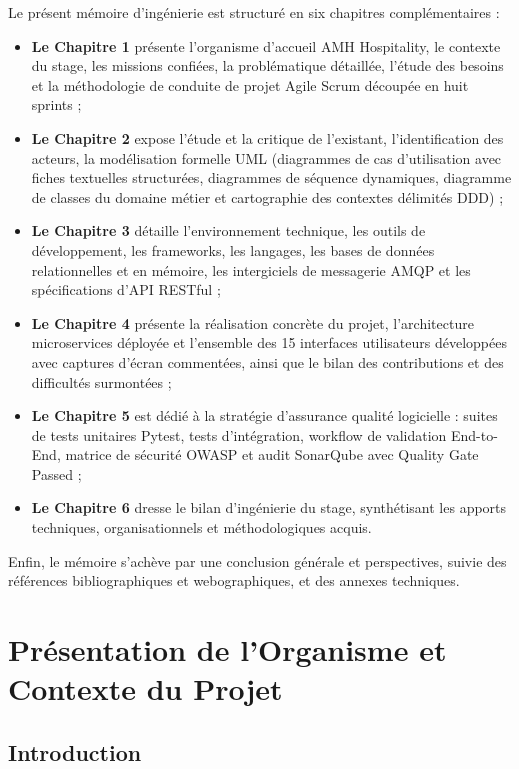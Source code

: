 \documentclass[12pt,a4paper,oneside]{report}
\begin{document}
Le présent mémoire d'ingénierie est structuré en six chapitres complémentaires :
\begin{itemize}
    \item \textbf{Le Chapitre 1} présente l'organisme d'accueil AMH Hospitality, le contexte du stage, les missions confiées, la problématique détaillée, l'étude des besoins et la méthodologie de conduite de projet Agile Scrum découpée en huit sprints ;
    \item \textbf{Le Chapitre 2} expose l'étude et la critique de l'existant, l'identification des acteurs, la modélisation formelle UML (diagrammes de cas d'utilisation avec fiches textuelles structurées, diagrammes de séquence dynamiques, diagramme de classes du domaine métier et cartographie des contextes délimités DDD) ;
    \item \textbf{Le Chapitre 3} détaille l'environnement technique, les outils de développement, les frameworks, les langages, les bases de données relationnelles et en mémoire, les intergiciels de messagerie AMQP et les spécifications d'API RESTful ;
    \item \textbf{Le Chapitre 4} présente la réalisation concrète du projet, l'architecture microservices déployée et l'ensemble des 15 interfaces utilisateurs développées avec captures d'écran commentées, ainsi que le bilan des contributions et des difficultés surmontées ;
    \item \textbf{Le Chapitre 5} est dédié à la stratégie d'assurance qualité logicielle : suites de tests unitaires Pytest, tests d'intégration, workflow de validation End-to-End, matrice de sécurité OWASP et audit SonarQube avec Quality Gate Passed ;
    \item \textbf{Le Chapitre 6} dresse le bilan d'ingénierie du stage, synthétisant les apports techniques, organisationnels et méthodologiques acquis.
\end{itemize}

Enfin, le mémoire s'achève par une conclusion générale et perspectives, suivie des références bibliographiques et webographiques, et des annexes techniques.

\chapter{Présentation de l'Organisme et Contexte du Projet}
\label{chap:contexte}

\section{Introduction}
\end{document}

